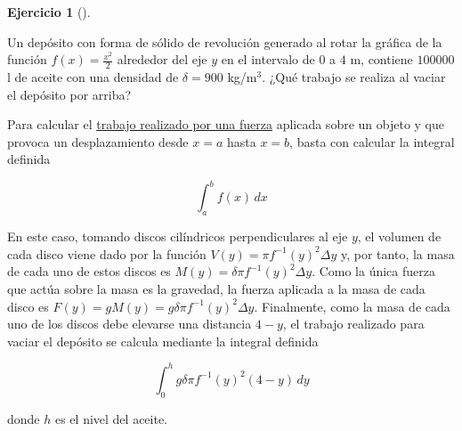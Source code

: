 \documentclass[
  a4paper,
]{scrreport}
\theoremstyle{definition}
\newtheorem{exercise}{Ejercicio}[chapter]
\theoremstyle{remark}
\begin{document}
\begin{exercise}[]\protect\hypertarget{exr-centro-masas}{}\label{exr-centro-masas}

Un depósito con forma de sólido de revolución generado al rotar la
gráfica de la función \(f(x)=\frac{x^2}{2}\) alrededor del eje \(y\) en
el intervalo de \(0\) a \(4\) m, contiene \(100000\) l de aceite con una
densidad de \(\delta = 900\) kg/m\(^3\). ¿Qué trabajo se realiza al
vaciar el depósito por arriba?

\end{exercise}

\begin{tcolorbox}[enhanced jigsaw, bottomtitle=1mm, rightrule=.15mm, left=2mm, colback=white, title=\textcolor{quarto-callout-note-color}{\faInfo}\hspace{0.5em}{Ayuda}, bottomrule=.15mm, colframe=quarto-callout-note-color-frame, toprule=.15mm, leftrule=.75mm, opacityback=0, coltitle=black, breakable, colbacktitle=quarto-callout-note-color!10!white, arc=.35mm, toptitle=1mm, titlerule=0mm, opacitybacktitle=0.6]

Para calcular el
\href{https://aprendeconalf.es/analisis-manual/09-integrales.html\#trabajo}{trabajo
realizado por una fuerza} aplicada sobre un objeto y que provoca un
desplazamiento desde \(x=a\) hasta \(x=b\), basta con calcular la
integral definida

\[
\int_a^b f(x)\,dx
\]

En este caso, tomando discos cilíndricos perpendiculares al eje \(y\),
el volumen de cada disco viene dado por la función
\(V(y)=\pi f^{-1}(y)^2\Delta y\) y, por tanto, la masa de cada uno de
estos discos es \(M(y)=\delta\pi f^{-1}(y)^2\Delta y\). Como la única
fuerza que actúa sobre la masa es la gravedad, la fuerza aplicada a la
masa de cada disco es \(F(y) = gM(y)= g\delta\pi f^{-1}(y)^2\Delta y\).
Finalmente, como la masa de cada uno de los discos debe elevarse una
distancia \(4-y\), el trabajo realizado para vaciar el depósito se
calcula mediante la integral definida

\[
\int_0^h g\delta\pi f^{-1}(y)^2(4-y)\,dy
\]

donde \(h\) es el nivel del aceite.

\end{tcolorbox}
\end{document}

